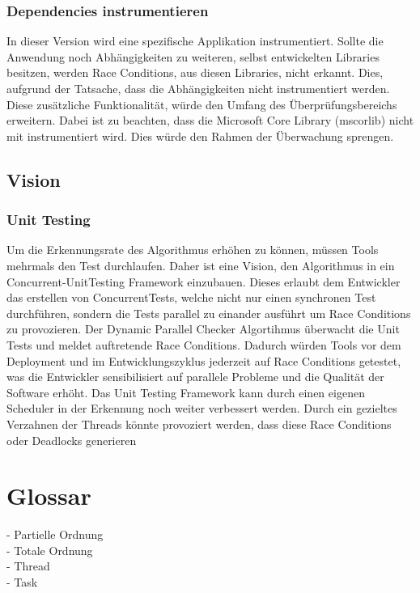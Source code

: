 \documentclass[10pt,a4paper]{article}
\begin{document}
\subsubsection*{Dependencies instrumentieren}
\begin{flushleft}
In dieser Version wird eine spezifische Applikation instrumentiert. Sollte die Anwendung noch  Abhängigkeiten zu weiteren, selbst entwickelten Libraries besitzen, werden Race Conditions, aus diesen Libraries, nicht erkannt. Dies, aufgrund der Tatsache, dass die Abhängigkeiten nicht instrumentiert werden. Diese zusätzliche Funktionalität, würde den Umfang des Überprüfungsbereichs erweitern. Dabei ist zu beachten, dass die Microsoft Core Library (mscorlib) nicht mit instrumentiert wird. Dies würde den Rahmen der Überwachung sprengen.
\end{flushleft}
\subsection{Vision}
\subsubsection*{Unit Testing}
\begin{flushleft}
Um die Erkennungsrate des Algorithmus erhöhen zu können, müssen Tools mehrmals den Test durchlaufen. Daher ist eine Vision, den Algorithmus in ein Concurrent-UnitTesting Framework einzubauen. Dieses erlaubt dem Entwickler das erstellen von ConcurrentTests, welche nicht nur einen synchronen Test durchführen, sondern die Tests parallel zu einander ausführt um Race Conditions zu provozieren. Der Dynamic Parallel Checker Algortihmus überwacht die Unit Tests und meldet auftretende Race Conditions. Dadurch würden Tools vor dem Deployment und im Entwicklungszyklus jederzeit auf Race Conditions getestet, was die Entwickler sensibilisiert auf parallele Probleme und die Qualität der Software erhöht. Das Unit Testing Framework kann durch einen eigenen Scheduler in der Erkennung noch weiter verbessert werden. Durch ein gezieltes Verzahnen der Threads könnte provoziert werden, dass diese Race Conditions oder Deadlocks generieren
\end{flushleft}
\section*{Glossar}
- Partielle Ordnung\\
- Totale Ordnung\\
- Thread\\
- Task\\
\end{document}
